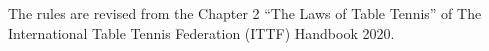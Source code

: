 The rules are revised from the Chapter 2 ``The Laws of Table Tennis'' of 
The International Table Tennis Federation (ITTF) Handbook 2020.
